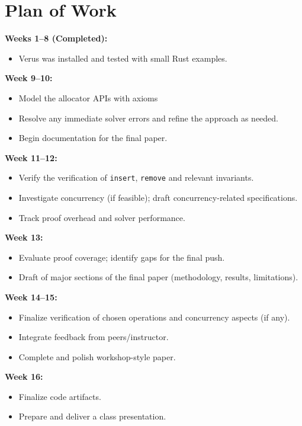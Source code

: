 \documentclass[conference]{IEEEtran}
\begin{document}
\section{Plan of Work}
\noindent\textbf{Weeks 1--8 (Completed):}
\begin{itemize}
\item Verus was installed and tested with small Rust examples.
\end{itemize}

\noindent\textbf{Week 9--10:}
\begin{itemize}
\item Model the allocator APIs with axioms
\item Resolve any immediate solver errors and refine the approach as needed.
\item Begin documentation for the final paper.
\end{itemize}

\noindent\textbf{Week 11--12:}
\begin{itemize}
\item Verify the verification of \texttt{insert}, \texttt{remove} and relevant invariants.
\item Investigate concurrency (if feasible); draft concurrency-related specifications.
\item Track proof overhead and solver performance.
\end{itemize}

\noindent\textbf{Week 13:}
\begin{itemize}
\item Evaluate proof coverage; identify gaps for the final push.
\item Draft of major sections of the final paper (methodology, results, limitations).
\end{itemize}

\noindent\textbf{Week 14--15:}
\begin{itemize}
\item Finalize verification of chosen operations and concurrency aspects (if any).
\item Integrate feedback from peers/instructor.
\item Complete and polish workshop-style paper.
\end{itemize}

\noindent\textbf{Week 16:}
\begin{itemize}
\item Finalize code artifacts.
\item Prepare and deliver a class presentation.
\end{itemize}
\end{document}
